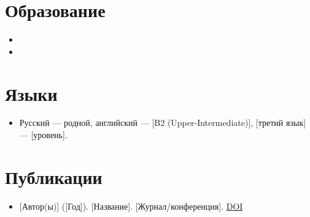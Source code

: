 \documentclass[11pt,a4paper,sans]{moderncv}
\begin{document}
\section{Образование}
\vspace{1pt}
\begin{itemize}

\item{}

\vspace{3pt}

\item{}

\end{itemize}


\section{Языки}
\vspace{1pt}
\begin{itemize}
\item {Русский — родной, английский — [B2 (Upper-Intermediate)], [третий язык] — [уровень].}
\end{itemize}


\section{Публикации}
\vspace{1pt}
\begin{itemize}
\item {[Автор(ы)] ([Год]). [Название]. [Журнал/конференция]. \href{[DOI_URL]}{DOI}}
\end{itemize}

\end{document}
